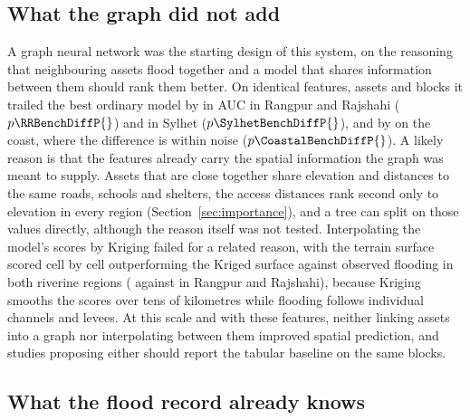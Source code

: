 \subsection{What the graph did not add}

A graph neural network was the starting design of this system, on the reasoning that neighbouring assets flood together and a model that shares information between them should rank them better. On identical features, assets and blocks it trailed the best ordinary model by \RRBenchGap{} in AUC in Rangpur and Rajshahi ($p\RRBenchDiffP{}$) and \SylhetBenchGap{} in Sylhet ($p\SylhetBenchDiffP{}$), and by \CoastalBenchGap{} on the coast, where the difference is within noise ($p\CoastalBenchDiffP{}$). A likely reason is that the features already carry the spatial information the graph was meant to supply. Assets that are close together share elevation and distances to the same roads, schools and shelters, the access distances rank second only to elevation in every region (Section~\ref{sec:importance}), and a tree can split on those values directly, although the reason itself was not tested. Interpolating the model's scores by Kriging failed for a related reason, with the terrain surface scored cell by cell outperforming the Kriged surface against observed flooding in both riverine regions (\RRSurfaceTerrainObsAUC{} against \RRSurfaceKrigedObsAUC{} in Rangpur and Rajshahi), because Kriging smooths the scores over tens of kilometres while flooding follows individual channels and levees. At this scale and with these features, neither linking assets into a graph nor interpolating between them improved spatial prediction, and studies proposing either should report the tabular baseline on the same blocks.

\subsection{What the flood record already knows}

